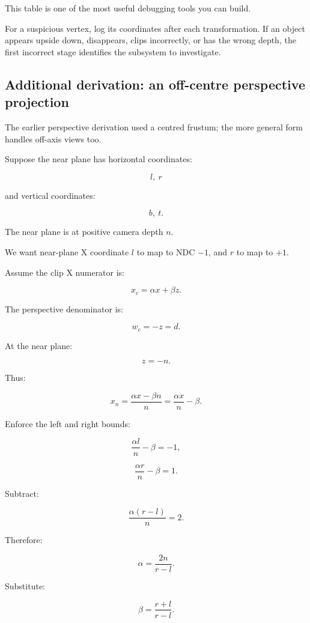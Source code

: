 This table is one of the most useful debugging tools you can build.

For a suspicious vertex, log its coordinates after each transformation. If an object appears upside down, disappears, clips incorrectly, or has the wrong depth, the first incorrect stage identifies the subsystem to investigate.

\subsection{Additional derivation: an off-centre perspective projection}\label{02-foundations-ii-ch037-additional-derivation-an-off-centre-perspective-projection}

\hypertarget{02-foundations-ii-ch037-additional-derivation-an-off-centre-perspective-projection}{}

The earlier perspective derivation used a centred frustum; the more general form handles off-axis views too.

Suppose the near plane has horizontal coordinates:

\[
 l,\ r
\]

and vertical coordinates:

\[
 b,\ t.
\]

The near plane is at positive camera depth \(n\).

We want near-plane X coordinate \(l\) to map to NDC \(-1\), and \(r\) to map to \(+1\).

Assume the clip X numerator is:

\[
 x_c=\alpha x+\beta z.
\]

The perspective denominator is:

\[
 w_c=-z=d.
\]

At the near plane:

\[
 z=-n.
\]

Thus:

\[
 x_n=\frac{\alpha x-\beta n}{n} = \frac{\alpha x}{n}-\beta.
\]

Enforce the left and right bounds:

\[
 \frac{\alpha l}{n}-\beta=-1,
\]

\[
 \frac{\alpha r}{n}-\beta=1.
\]

Subtract:

\[
 \frac{\alpha(r-l)}n=2.
\]

Therefore:

\[
 \boxed{ \alpha=\frac{2n}{r-l} }.
\]

Substitute:

\[
 \boxed{ \beta=\frac{r+l}{r-l} }.
\]


